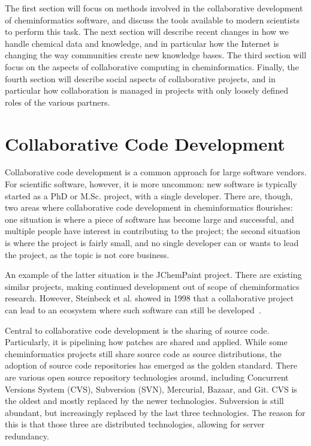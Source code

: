 \documentclass[11pt]{book}
\begin{document}
The first section will focus on methods involved in the collaborative
development of cheminformatics software, and discuss the tools available to modern
scientists to perform this task. The next section will describe
recent changes in how we handle chemical data and knowledge, and in
particular how the Internet is changing the way communities create new
knowledge bases. The third section will focus on the aspects of
collaborative computing in cheminformatics. Finally, the fourth
section will describe social aspects of collaborative projects, and in
particular how collaboration is managed in projects with only loosely
defined roles of the various partners.

\section{Collaborative Code Development}

Collaborative code development is a common approach for large software vendors.
For scientific software, however, it is more uncommon: new software is typically
started as a PhD or M.Sc. project, with a single developer. There are, though,
two areas where collaborative code development in cheminformatics flourishes:
one situation is where a piece of software has become large and successful,
and multiple people have interest in contributing to the project; the second
situation is where the project is fairly small, and no single developer can
or wants to lead the project, as the topic is not core business.

An example of the latter situation is the JChemPaint project. There are existing
similar projects, making continued development out of scope of cheminformatics
research. However, Steinbeck et al. showed in 1998 that a collaborative project
can lead to an ecosystem where such software can still be
developed~\cite{Krause2000}.

Central to collaborative code development is the sharing of source code. Particularly,
it is pipelining how patches are shared and applied. While some cheminformatics
projects still share source code as source distributions, the adoption of
source code repositories has emerged as the golden standard. There are various 
open source repository technologies around, including Concurrent Versions System (CVS),
Subversion (SVN), Mercurial, Bazaar, and Git. CVS is the oldest and mostly replaced
by the newer technologies. Subversion is still abundant, but increasingly
replaced by the last three technologies. The reason for this is that
those three are distributed technologies, allowing for server redundancy.
\end{document}
